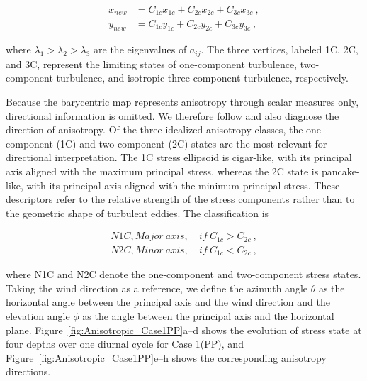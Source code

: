 \documentclass[draft]{agujournal2019}
\begin{document}
\begin{linenomath*}
\begin{subequations}
\begin{align}
x_{new}&= C_{1c}x_{1c}+C_{2c}x_{2c}+C_{3c}x_{3c}\ , \\
y_{new}&= C_{1c}y_{1c}+C_{2c}y_{2c}+C_{3c}y_{3c} \ ,
\end{align}
\label{eq:Location}
\end{subequations}
\end{linenomath*}
where $\lambda_1>\lambda_2>\lambda_3$ are the eigenvalues of $a_{ij}$. The three vertices, labeled 1C, 2C, and 3C, represent the limiting states of one-component turbulence, two-component turbulence, and isotropic three-component turbulence, respectively.

Because the barycentric map represents anisotropy through scalar measures only, directional information is omitted. We therefore follow  and also diagnose the direction of anisotropy. Of the three idealized anisotropy classes, the one-component (1C) and two-component (2C) states are the most relevant for directional interpretation. The 1C stress ellipsoid is cigar-like, with its principal axis aligned with the maximum principal stress, whereas the 2C state is pancake-like, with its principal axis aligned with the minimum principal stress. These descriptors refer to the relative strength of the stress components rather than to the geometric shape of turbulent eddies. The classification is
\begin{linenomath*}
\begin{subequations}
\begin{align}
N1C, Major\ axis,&\ if\  C_{1c}>C_{2c}\ , \\
N2C, Minor\ axis,&\ if\  C_{1c}<C_{2c} \ ,
\end{align}
\label{eq:Direction}
\end{subequations}
\end{linenomath*}
where N1C and N2C denote the one-component and two-component stress states. Taking the wind direction as a reference, we define the azimuth angle $\theta$ as the horizontal angle between the principal axis and the wind direction and the elevation angle $\phi$ as the angle between the principal axis and the horizontal plane. Figure~\ref{fig:Anisotropic_Case1PP}a--d shows the evolution of stress state at four depths over one diurnal cycle for Case 1(PP), and Figure~\ref{fig:Anisotropic_Case1PP}e--h shows the corresponding anisotropy directions.
\end{document}
